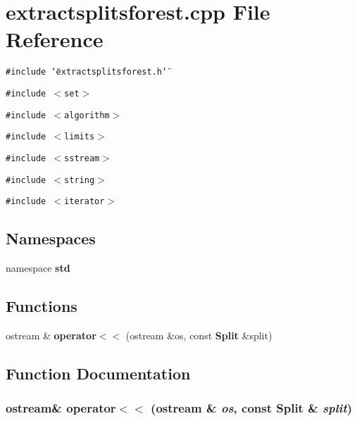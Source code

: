 \section{extractsplitsforest.cpp File Reference}
\label{extractsplitsforest_8cpp}
{\tt \#include \char`\"{}extractsplitsforest.h\char`\"{}}\par
{\tt \#include $<$set$>$}\par
{\tt \#include $<$algorithm$>$}\par
{\tt \#include $<$limits$>$}\par
{\tt \#include $<$sstream$>$}\par
{\tt \#include $<$string$>$}\par
{\tt \#include $<$iterator$>$}\par
\subsection*{Namespaces}
\begin{CompactItemize}
\item 
namespace {\bf std}
\end{CompactItemize}
\subsection*{Functions}
\begin{CompactItemize}
\item 
ostream \& {\bf operator$<$$<$} (ostream \&os, const {\bf Split} \&split)
\end{CompactItemize}


\subsection{Function Documentation}
\subsubsection{\setlength{\rightskip}{0pt plus 5cm}ostream\& operator$<$$<$ (ostream \& {\em os}, const {\bf Split} \& {\em split})}\label{extractsplitsforest_8cpp_a0}


